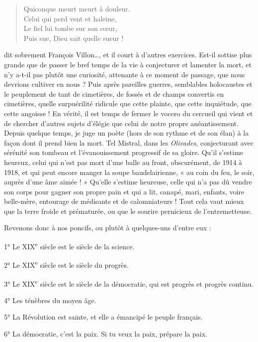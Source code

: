 \documentclass[french,twoside]{book} %
\begin{document}
\begin{verse}
Quiconque meurt meurt à douleur.\\
Celui qui perd vent et haleine,\\
Le fiel lui tombe sur son cœur,\\
Puis sue, Dieu sait quelle sueur !\\
\end{verse}

\noindent dit sobrement François Villon…, et il court à d’autres exercices. Est-il sottise plus grande que de passer le bref temps de la vie à conjecturer et lamenter la mort, et n’y a-t-il pas plutôt une curiosité, attenante à ce moment de passage, que nous devrions cultiver en nous ? Puis après pareilles guerres, semblables holocaustes et le peuplement de tant de cimetières, de fossés et de champs convertis en cimetières, quelle surpuérilité ridicule que cette plainte, que cette inquiétude, que cette angoisse ! En vérité, il est temps de fermer le vocero du cercueil qui vient et de chercher d’autres sujets d’élégie que celui de notre propre anéantissement. Depuis quelque temps, je juge un poète (hors de son rythme et de son élan) à la façon dont il prend bien la mort. Tel Mistral, dans les {\itshape Olivades}, conjecturant avec sérénité son tombeau et l’évanouissement progressif de sa gloire. Qu’il s’estime heureux, celui qui n’est pas mort d’une balle au front, obscurément, de 1914 à 1918, et qui peut encore manger la soupe baudelairienne, « au coin du feu, le soir, auprès d’une âme aimée ! » Qu’elle s’estime heureuse, celle qui n’a pas dû vendre son corps pour gagner son propre pain et qui a lit, canapé, mari, enfants, voire belle-mère, entourage de médisants et de calomniateurs ! Tout cela vaut mieux que la terre froide et prématurée, ou que le sourire pernicieux de l’entremetteuse.\par
Revenons donc à nos poncifs, ou plutôt à quelques-uns d’entre eux :\par
1° Le XIX\textsuperscript{e} siècle est le siècle de la science.\par
2° Le XIX\textsuperscript{e} siècle est le siècle du progrès.\par
3° Le XIX\textsuperscript{e} siècle est le siècle de la démocratie, qui est progrès et progrès continu.\par
4° Les ténèbres du moyen âge.\par
5° La Révolution est sainte, et elle a émancipé le peuple français.\par
6° La démocratie, c’est la paix. Si tu veux la paix, prépare la paix.\par
\end{document}
